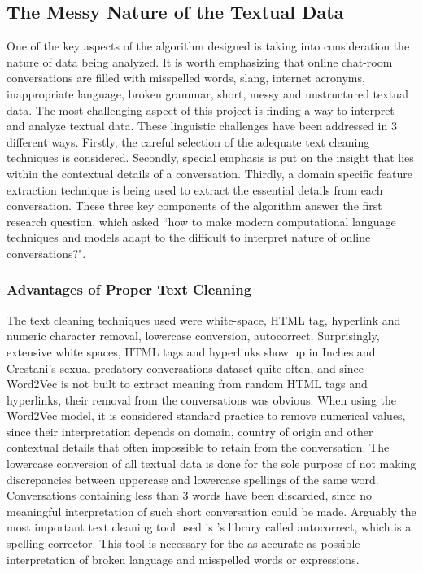 \documentclass[11pt]{article}
\begin{document}
\subsection{The Messy Nature of the Textual Data}
One of the key aspects of the algorithm designed is taking into consideration the nature of data being analyzed. It is worth emphasizing that online chat-room conversations are filled with misspelled words, slang, internet acronyms, inappropriate language, broken grammar, short, messy and unstructured textual data. The most challenging aspect of this project is finding a way to interpret and analyze textual data. These linguistic challenges have been addressed in 3 different ways. Firstly, the careful selection of the adequate text cleaning techniques is considered. Secondly, special emphasis is put on the insight that lies within the contextual details of a conversation. Thirdly, a domain specific feature extraction technique is being used to extract the essential details from each conversation. These three key components of the algorithm answer the first research question, which asked ``how to make modern computational language techniques and models adapt to the difficult to interpret nature of online conversations?".

\subsubsection{Advantages of Proper Text Cleaning}
The text cleaning techniques used were white-space, HTML tag, hyperlink and numeric character removal, lowercase conversion, autocorrect. Surprisingly, extensive white spaces, HTML tags and hyperlinks show up in Inches and Crestani's sexual predatory conversations dataset quite often, and since Word2Vec is not built to extract meaning from random HTML tags and hyperlinks, their removal from the conversations was obvious. When using the Word2Vec model, it is considered standard practice to remove numerical values, since their interpretation depends on domain, country of origin and other contextual details that often impossible to retain from the conversation. The lowercase conversion of all textual data is done for the sole purpose of not making discrepancies between uppercase and lowercase spellings of the same word. Conversations containing less than 3 words have been discarded, since no meaningful interpretation of such short conversation could be made. Arguably the most important text cleaning tool used is \cite{mccallum_2016}'s library called autocorrect, which is a spelling corrector. This tool is necessary for the as accurate as possible interpretation of broken language and misspelled words or expressions.
\end{document}
